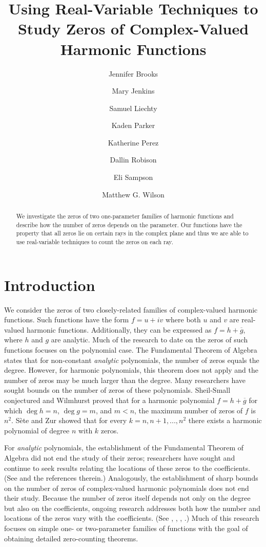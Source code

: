 \documentclass{amsart}
\title[Zeros of Harmonic Functions]{Using Real-Variable Techniques to Study Zeros of Complex-Valued Harmonic Functions}
\author[Brooks]{Jennifer Brooks}
\author[Jenkins]{Mary Jenkins}
\author[Liechty]{Samuel Liechty}
\author[Parker]{Kaden Parker}
\author[Perez]{Katherine Perez}
\author[Robison]{Dallin Robison}
\author[Sampson]{Eli Sampson}
\author[Wilson]{Matthew G. Wilson}
\theoremstyle{definition}
\theoremstyle{remark}
\begin{document}
\maketitle

\begin{abstract}
    We investigate the zeros of two one-parameter families of harmonic functions and describe how the number of zeros depends on the parameter. Our functions have the property that all zeros lie on certain rays in the complex plane and thus we are able to use real-variable techniques to count the zeros on each ray. 
\end{abstract}

\section{Introduction}

We consider the zeros of two closely-related families of complex-valued harmonic functions. Such functions have the form $f = u + iv$ where both $u$ and $v$ are real-valued harmonic functions. Additionally, they can be expressed as $f = h + \overline{g}$, where $h$ and $g$ are analytic.  Much of the research to date on the zeros of such functions focuses on the polynomial case. The Fundamental Theorem of Algebra states that for non-constant {\em analytic} polynomials, the number of zeros equals the degree. However, for harmonic polynomials, this theorem does not apply and the number of zeros may be much larger than the degree. Many researchers have sought bounds on the number of zeros of these polynomials. Sheil-Small conjectured \cite{sheil} and Wilmhurst \cite{wilmshurst1998valence} proved that for a harmonic polynomial $f = h + \overline{g}$ for which $\deg h = n$, $\deg g= m$, and $m < n$, the maximum number of zeros of $f$ is $n^2$. S\`{e}te and Zur \cite{sete2024zeros} showed that for every $k  = n,n + 1,...,n^2$ there exists a harmonic polynomial of degree $n$ with $k$ zeros.

For {\em analytic} polynomials, the establishment of the Fundamental Theorem of Algebra did not end the study of their zeros; researchers have sought and continue to seek results relating the locations of these zeros to the coefficients. (See \cite{melman1} and the references therein.) Analogously, the establishment of sharp bounds on the number of zeros of complex-valued harmonic polynomials does not end their study. Because the number of zeros itself depends not only on the degree but also on the coefficients, ongoing research addresses both how the number and locations of the zeros vary with the coefficients. (See \cite{sam}, \cite{work}, \cite{legesse2022location}, \cite{melman24}.) Much of this research focuses on simple one- or two-parameter families of functions with the goal of obtaining detailed zero-counting theorems.   
\end{document}
